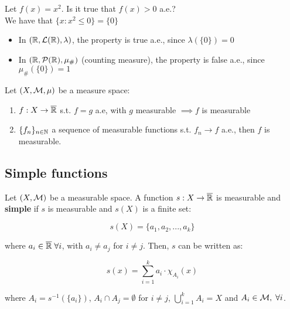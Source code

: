 \begin{example}
    Let $f(x) = x^2$. Is it true that $f(x) > 0$ a.e.?\\

    We have that $\{x: x^2 \leq 0\} = \{0\}$
    \vspace{1em}

    \begin{itemize}
        \item In $(\mathbb{R}, \mathcal{L}(\mathbb{R}), \lambda)$, the property is true a.e., since
        $\lambda(\{0\}) = 0$

        \item In $(\mathbb{R}, \mathcal{P}(\mathbb{R}), \mu_{\#})$ (counting measure), the property is false a.e.,
        since $\mu_{\#}(\{0\}) = 1$
    \end{itemize}
\end{example}

\begin{fproposition}
    Let $(X, \mathcal{M}, \mu)$ be a measure space:
    \vspace{1em}
    \begin{enumerate}
        \item $f: X \to \overline{\mathbb{R}}$ s.t. $f = g$ a.e, with $g$ measurable $\implies f$ is measurable
        \vspace{1em}
        \item $\{f_n\}_{n \in \mathbb{N}}$ a sequence of measurable functions s.t. $f_n \to f$ a.e., 
        then $f$ is measurable.
    \end{enumerate}
\end{fproposition}

\subsection{Simple functions}

\begin{fdefinition}
    Let $(X, \mathcal{M})$ be a measurable space. A function $s: X \to \overline{\mathbb{R}}$ is 
    measurable and \textbf{simple} if $s$ is measurable and $s(X)$ is a finite set:

    $$s(X) = \{a_1, a_2, ..., a_k\}$$

    where $a_i \in \overline{\mathbb{R}} \; \forall i$, with $a_i \neq a_j$ for $i \neq j$.
    Then, $s$ can be written as:

    $$s(x) = \sum_{i=1}^{k} a_i \cdot \chi_{A_i}(x)$$

    where $A_i = s^{-1}(\{a_i\})$, $A_i \cap A_j = \emptyset$ for $i \neq j$,
    $\bigcup_{i=1}^{k} A_i = X$ and $A_i \in \mathcal{M}, \; \forall i$.
\end{fdefinition}

